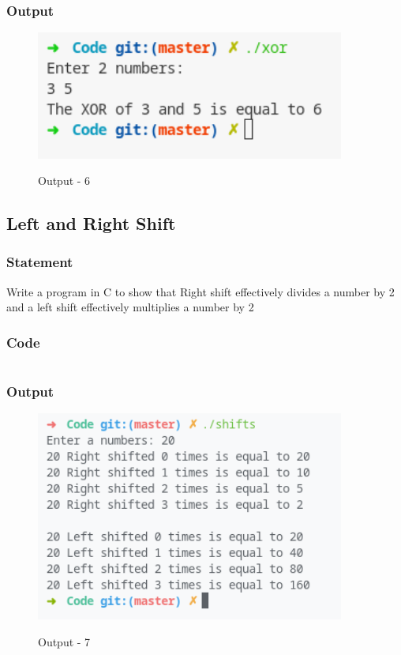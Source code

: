 \subsubsection{Output}
\begin{figure}[!htb]
  \centering
  \includegraphics[width=4in]{Images/xor.png}
  \label{Output-6}
  \caption{Output - 6}
\end{figure}


\pagebreak
\subsection{Left and Right Shift}

\subsubsection{Statement}
Write a program in C to show that Right shift effectively divides a number by 2 and a left shift
effectively multiplies a number by 2

\subsubsection{Code}
\inputminted[]{c}{../Code/shifts.cpp}
\subsubsection{Output}
\begin{figure}[H]
  \centering
  \includegraphics[width=4in]{Images/shifts.png}
  \label{Output-7}
  \caption{Output - 7}
\end{figure}


